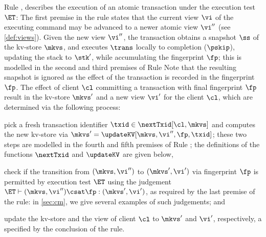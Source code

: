 Rule , describes the execution of an atomic 
transaction under the execution test $\ET$:
The first premise in the rule
states that the current view $\vi$ of the executing command may be advanced to a newer atomic view $\vi''$ (see \cref{def:views}). 
Given the new view $\vi''$, the transaction obtains a snapshot $\ss$ of the kv-store $\mkvs$, 
and executes $\trans$ locally to completion ($\pskip$), updating the stack to $\stk'$, while accumulating the fingerprint $\fp$; 
this is modelled in the second and third premises of Rule 
Note that the resulting snapshot is ignored 
as the effect of the transaction is recorded in the fingerprint $\fp$. 
%
The effect of client $\cl$ committing a transaction with final fingerprint $\fp$ result 
in the kv-store $\mkvs'$ and a new view $\vi'$ for the client $\cl$, which are determined via 
the following process: 
\begin{enumerate*}
\item pick a fresh transaction identifier $\txid \in \nextTxid[\cl, \mkvs]$ 
and computes the new kv-store via $\mkvs' = \updateKV[\mkvs, \vi'', \fp, \txid]$; these 
two steps are modelled in the fourth and fifth premises of Rule ;  the definitions of the functions $\nextTxid$ 
and $\updateKV$ are given below, 
\item check if the transition from \( (\mkvs, \vi'') \)  to 
    \( (\mkvs', \vi') \) via fingerprint \( \fp \) is permitted by execution test $\ET$
    using the judgement $\ET \vdash (\mkvs, \vi'') \csat \fp : (\mkvs', \vi')$, as required by the last premise of the rule: 
    in \cref{sec:cm}, we give several examples of such judgements; and 
\item update the kv-store and the view of client $\cl$ to $\mkvs'$ and $\vi'$, respectively, a specified by the conclusion of the rule.
\end{enumerate*}
